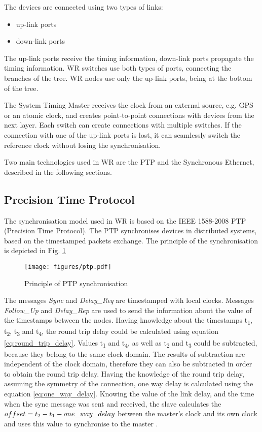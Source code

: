     The devices are connected using two types of links:
    \begin{itemize}
        \item up-link ports
        \item down-link ports
    \end{itemize}
    The up-link ports receive the timing information, down-link ports propagate the timing information. WR switches use both types of ports, connecting the branches of the tree.  WR nodes use only the up-link ports, being at the bottom of the tree. 
    
    The System Timing Master receives the clock from an external source, e.g. GPS or an atomic clock, and creates point-to-point connections with devices from the next layer. Each switch can create connections with multiple switches. If the connection with one of the up-link ports is lost, it can seamlessly switch the reference clock without losing the synchronisation.
    
    Two main technologies used in WR are the PTP and the Synchronous Ethernet, described in the following sections.


    \subsection{Precision Time Protocol} \label{subsec:PTP}
        The synchronisation model used in WR is based on the IEEE 1588-2008 PTP (Precision Time Protocol). The PTP synchronises devices in distributed systems, based on the timestamped packets exchange. The principle of the synchronisation is depicted in Fig. \ref{fig:ptp}
        \begin{figure}
        	\centerline{\texttt{[image: figures/ptp.pdf]}}
        	\caption{Principle of PTP synchronisation}
        	\label{fig:ptp}
        \end{figure}

        The messages \textit{Sync} and \textit{Delay\_Req} are timestamped with local clocks. Messages \textit{Follow\_Up} and \textit{Delay\_Rep} are used to send the information about the value of the timestamps between the nodes. Having knowledge about the timestamps t\textsubscript{1}, t\textsubscript{2}, t\textsubscript{3} and t\textsubscript{4}, the round trip delay could be calculated using equation \ref{eq:round_trip_delay}. Values t\textsubscript{1} and t\textsubscript{4}, as well as t\textsubscript{2} and t\textsubscript{3} could be subtracted, because they belong to the same clock domain. The results of subtraction are independent of the clock domain, therefore they can also be subtracted in order to obtain the round trip delay. Having the knowledge of the round trip delay, assuming the symmetry of the connection, one way delay is calculated using the equation \ref{eq:one_way_delay}. Knowing the value of the link delay, and the time when the sync message was sent and received, the slave calculates the $offset =  t\textsubscript{2} - t\textsubscript{1} - one\_way\_delay $ between the master's clock and its own clock and uses this value to synchronise to the master \cite{ptp}.
        
